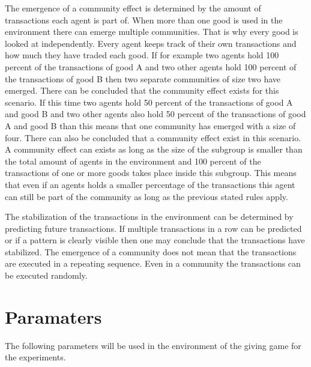 \documentclass[twoside,openright]{uva-bachelor-thesis}
\begin{document}
The emergence of a community effect is determined by the amount of transactions each agent is part of. When more than one good is used in the environment there can emerge multiple communities. That is why every good is looked at independently. Every agent keeps track of their own transactions and how much they have traded each good. If for example two agents hold 100 percent of the transactions of good A and two other agents hold 100 percent of the transactions of good B then two separate communities of size two have emerged. There can be concluded that the community effect exists for this scenario. If this time two agents hold 50 percent of the transactions of good A and good B and two other agents also hold 50 percent of the transactions of good A and good B than this means that one community has emerged with a size of four. There can also be concluded that a community effect exist in this scenario.  A community effect can exists as long as the size of the subgroup is smaller than the total amount of agents in the environment and 100 percent of the transactions of one or more goods takes place inside this subgroup. This means that even if an agents holds a smaller percentage of the transactions this agent can still be part of the community as long as the previous stated rules apply.

The stabilization of the transactions in the environment can be determined by predicting future transactions. If multiple transactions in a row can be predicted or if a pattern is clearly visible then one may conclude that the transactions have stabilized. The emergence of a community does not mean that the transactions are executed in a repeating sequence. Even in a community the transactions can be executed randomly.


\section{Paramaters}
The following parameters will be used in the environment of the giving game for the experiments.
\end{document}
